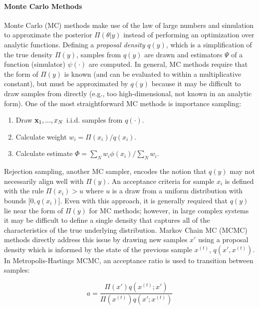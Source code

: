 \paragraph{Monte Carlo Methods}
Monte Carlo (MC) methods make use of the law of large numbers and simulation to approximate the posterior $\Pi(\theta|y)$ instead of performing an optimization over analytic functions\autocite{mackay1998introduction}. Defining a \emph{proposal density} $q(y)$, which is a simplification of the true density $\Pi(y)$, samples from $q(y)$ are drawn and estimators $\Psi$ of a function (simulator) $\psi(\cdot)$ are computed. In general, MC methods require that the form of $\Pi(y)$ is known (and can be evaluated to within a multiplicative constant), but must be approximated by $q(y)$ because it may be difficult to draw samples from directly (e.g., too high-dimensional, not known in an analytic form). One of the most straightforward MC methods is importance sampling\autocite{glynn1989importance}:

\begin{enumerate}
    \item Draw $\mathbf{x}_1,...,x_N$ i.i.d. samples from $q(\cdot)$.
    \item Calculate weight $w_i = \Pi(x_i) / q(x_i)$.
    \item Calculate estimate $\Phi = \sum_{N} w_i \phi(x_i) / \sum_N w_i$.
\end{enumerate}

Rejection sampling\autocite{mackay1998introduction}, another MC sampler, encodes the notion that $q(y)$ may not necessarily align well with $\Pi(y)$. An acceptance criteria for sample $x_i$ is defined with the rule $\Pi(x_i) > u$ where $u$ is a draw from a uniform distribution with bounds [$0, q(x_i)$]. Even with this approach, it is generally required that $q(y)$ lie near the form of $\Pi(y)$ for MC methods; however, in large complex systems it may be difficult to define a single density that captures all of the characteristics of the true underlying distribution. Markov Chain MC (MCMC) methods directly address this issue by drawing new samples $x'$ using a proposal density which is informed by the state of the previous sample $x^{(t)}$, $q(x',x^{(t)})$. In Metropolis-Hastings MCMC\autocite{liu1996metropolized,metropolis1953equation}, an acceptance ratio is used to transition between samples:

\begin{equation}
    a = \frac{\Pi(x')q(x^{(t)}; x')}{\Pi(x^{(t)})q(x'; x^{(t)})}
\end{equation}

